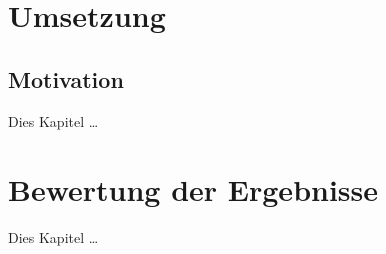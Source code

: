 \chapter{Umsetzung}

\section{Motivation}

Dies Kapitel \dots

\chapter{Bewertung der Ergebnisse}

Dies Kapitel \dots


